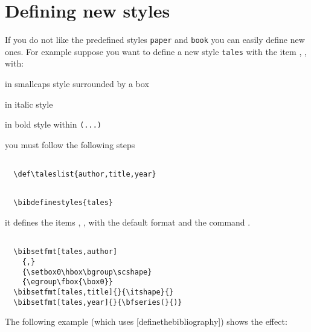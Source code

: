 \documentclass[a4paper]{article}
\begin{document}
\section{Defining new styles}
%
If you do not like the predefined styles \verb'paper' and \verb'book'
you can easily define new ones. For example suppose you want to 
define a new style \verb'tales' with the item ,
,  with:

\begin{desc}
  \item[\char`\\author] in smallcaps style surrounded by a box
  \item[\char`\\title] in italic style
  \item[\char`\\year]  in bold style  within \verb'(...)'
\end{desc}
%
you must follow the following steps
%
\begin{desc}
  \item[define the list of items]
\begin{verbatim}

  \def\taleslist{author,title,year}

\end{verbatim}
  \item[define the command ``talesref'' with the items]
\begin{verbatim}

  \bibdefinestyles{tales}

\end{verbatim}
  it defines the items , ,
   with the default format and the command
  .
  \item[change the default formatting]
\begin{verbatim}

  \bibsetfmt[tales,author]
    {,}
    {\setbox0\hbox\bgroup\scshape}
    {\egroup\fbox{\box0}}
  \bibsetfmt[tales,title]{}{\itshape}{}
  \bibsetfmt[tales,year]{}{\bfseries(}{)}

\end{verbatim}
\end{desc}
%
The following example (which uses [definethebibliography])
shows the effect:
%
%
\end{document}
